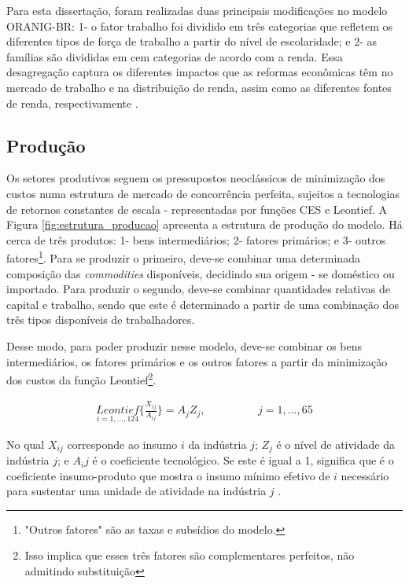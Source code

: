 Para esta dissertação, foram realizadas duas principais modificações no modelo ORANIG-BR: 1- o fator trabalho foi dividido em três categorias que refletem os diferentes tipos de força de trabalho a partir do nível de escolaridade; e 2- as famílias são divididas em cem categorias de acordo com a renda. Essa desagregação captura os diferentes impactos que as reformas econômicas têm no mercado de trabalho e na distribuição de renda, assim como as diferentes fontes de renda, respectivamente \cite{carneiro06}.

\subsection{Produção} \label{subsec:producao}

Os setores produtivos seguem os pressupostos neoclássicos de minimização dos custos numa estrutura de mercado de concorrência perfeita, sujeitos a tecnologias de retornos constantes de escala - representadas por funções CES e Leontief. A Figura \ref{fig:estrutura_producao} apresenta a estrutura de produção do modelo. Há cerca de três produtos: 1- bens intermediários; 2- fatores primários; e 3- outros fatores\footnote{"Outros fatores" são as taxas e subsídios do modelo.}. Para se produzir o primeiro, deve-se combinar uma determinada composição das \textit{commodities} disponíveis, decidindo sua origem - se doméstico ou importado. Para produzir o segundo, deve-se combinar quantidades relativas de capital e trabalho, sendo que este é determinado a partir de uma combinação dos três tipos disponíveis de trabalhadores.

Desse modo, para poder produzir nesse modelo, deve-se combinar os bens intermediários, os fatores primários e os outros fatores a partir da minimização dos custos da função Leontief\footnote{Isso implica que esses três fatores são complementares perfeitos, não admitindo substituição}.

\begin{align}
	\underset{i = 1, ... , 124}{Leontief} \{\frac{X_{ij}}{A_{ij}}\} = A_jZ_j, \hspace{2cm} j = 1, ... , 65
\end{align}

No qual $X_{ij}$ corresponde ao insumo $i$ da indústria $j$; $Z_j$ é o nível de atividade da indústria $j$; e $A_ij$ é o coeficiente tecnológico. Se este é igual a 1, significa que é o coeficiente insumo-produto que mostra o insumo mínimo efetivo de $i$ necessário para sustentar uma unidade de atividade na indústria $j$ \cite{dixit80}.

